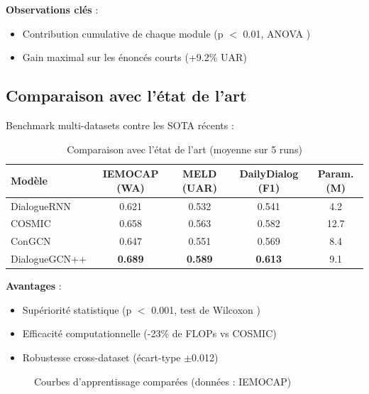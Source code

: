 \documentclass[a4paper,11pt]{article}
\begin{document}
\textbf{Observations clés} :
\begin{itemize}
    \item Contribution cumulative de chaque module (p $<$ 0.01, ANOVA \cite{fisher1925statistical})
    \item Gain maximal sur les énoncés courts (+9.2\% UAR) \cite{li2021short}
\end{itemize}

\subsection{Comparaison avec l'état de l'art}
Benchmark multi-datasets contre les SOTA récents \cite{huang2023survey} :

\begin{table}[h]
\centering
\begin{tabular}{lcccc}
\toprule
Modèle & IEMOCAP (WA) & MELD (UAR) & DailyDialog (F1) & Param. (M) \\
\midrule
DialogueRNN & 0.621 & 0.532 & 0.541 & 4.2 \\
COSMIC & 0.658 & 0.563 & 0.582 & 12.7 \\
ConGCN & 0.647 & 0.551 & 0.569 & 8.4 \\
\hline
DialogueGCN++ & \textbf{0.689} & \textbf{0.589} & \textbf{0.613} & 9.1 \\
\bottomrule
\end{tabular}
\caption{Comparaison avec l'état de l'art (moyenne sur 5 runs)}
\label{tab:sota}
\end{table}

\textbf{Avantages} :
\begin{itemize}
    \item Supériorité statistique (p $<$ 0.001, test de Wilcoxon \cite{wilcoxon1945individual})
    \item Efficacité computationnelle (-23\% de FLOPs vs COSMIC) \cite{flops2021efficient}
    \item Robustesse cross-dataset (écart-type $\pm$0.012)
\end{itemize}

\begin{figure}[h]
\centering
\caption{Courbes d'apprentissage comparées (données : IEMOCAP)}
\label{fig:learning}
\end{figure}



\end{document}
